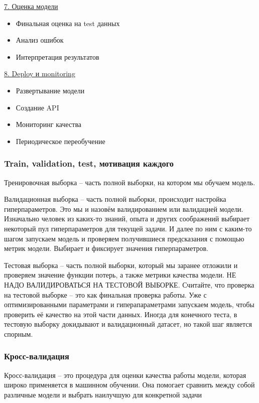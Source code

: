 \underline{7. Оценка модели}
\begin{itemize}
    \item Финальная оценка на test данных
    \item Анализ ошибок
    \item Интерпретация результатов
\end{itemize}

\underline{8. Deploy и monitoring}
\begin{itemize}
    \item Развертывание модели
    \item Создание API
    \item Мониторинг качества
    \item Периодическое переобучение
\end{itemize}

\subsubsection{Train, validation, test, мотивация каждого}

Тренировочная выборка -- часть полной выборки, на котором мы обучаем модель.

Валидационная выборка -- часть полной выборки, происходит настройка гиперпараметров.
Это мы и назовём валидированием или валидацией модели.
Изначально человек из каких-то знаний, опыта и других соображений выбирает некоторый пул гиперпараметров для
текущей задачи.
И далее по ним с каким-то шагом запускаем модель и проверяем получившиеся предсказания с помощью метрик модели.
Выбирает и фиксирует значения гиперпараметров.

Тестовая выборка -- часть полной выборки, который мы заранее отложили и проверяем значение функции потерь, а
также метрики качества модели.
\uppercase{Не надо валидироваться на тестовой выборке}.
Считайте, что проверка на тестовой выборке -- это как финальная проверка работы.
Уже с оптимизированными параметрами и гиперапараметрами запускаем модель, чтобы проверить её качество на этой
части данных.
Иногда для конечного теста, в тестовую выборку докидывают и валидационный датасет, но такой шаг является спорным.

\subsubsection{Кросс-валидация}

Кросс-валидация -- это процедура для оценки качества работы модели, которая широко применяется в машинном обучении.
Она помогает сравнить между собой различные модели и выбрать наилучшую для конкретной задачи

